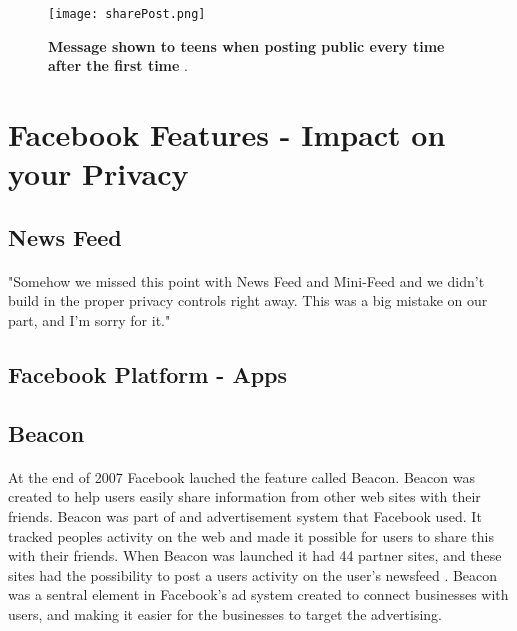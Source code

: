 \begin{figure}[h!]
\centering
\texttt{[image: sharePost.png]}
\caption [Message shown to teens when posting public every time after the first time]{\textbf{Message shown to teens when posting public every time after the first time} \cite{defaultTeens}.} 
\label{fig:sharePost}
\end{figure}

\section{Facebook Features - Impact on your Privacy}\label{sec:facebook_features}


\subsection{News Feed}
\paragraph{}
"Somehow we missed this point with News Feed and Mini-Feed and we didn't build in the proper privacy controls right away. This was a big mistake on our part, and I'm sorry for it." \cite{FacebookStoryInceptionToIsp}

\subsection{Facebook Platform - Apps}


\subsection{Beacon}

\paragraph{}
At the end of 2007 Facebook lauched the feature called Beacon. Beacon was created to help users easily share information from other web sites with their friends. Beacon was part of and advertisement system that Facebook used. It tracked peoples activity on the web and made it possible for users to share this with their friends. When Beacon was launched it had 44 partner sites, and these sites had the possibility to post a users activity on the user's newsfeed \cite{BeaconWebsites}. Beacon was a sentral element in Facebook's ad system created to connect businesses with users, and making it easier for the businesses to target the advertising. 

